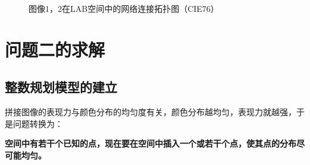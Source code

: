 \documentclass{article}
\begin{document}
\begin{figure}[H]
	\centering
	\quad
	\caption{图像1，2在LAB空间中的网络连接拓扑图（CIE76）}
	\label{fig:labcie76}
\end{figure}
 \section{问题二的求解}
 \subsection{整数规划模型的建立}
 拼接图像的表现力与颜色分布的均匀度有关，颜色分布越均匀，表现力就越强，于是问题转换为：
 
 \textbf{空间中有若干个已知的点，现在要在空间中插入一个或若干个点，使其点的分布尽可能均匀。}
 
\end{document}
